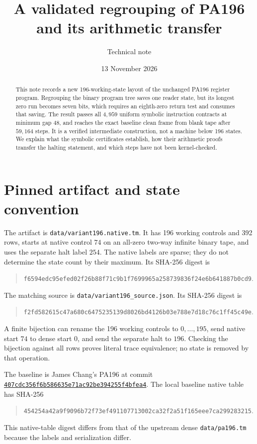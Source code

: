 \documentclass[11pt]{article}
\title{A validated regrouping of PA196\\and its arithmetic transfer}
\author{Technical note}
\date{13 November 2026}
\newcommand{\file}[1]{\texttt{\nolinkurl{#1}}}
\begin{document}
\maketitle

\begin{abstract}
This note records a new 196-working-state layout of the unchanged
PA196 register program.  Regrouping the binary program tree saves
one reader state, but its longest zero run becomes seven bits, which
requires an eighth-zero return test and consumes that saving.  The
result passes all $4{,}959$ uniform symbolic instruction contracts
at minimum gap $48$, and reaches the exact baseline clean frame
from blank tape after $59{,}164$ steps.  It is a verified intermediate
construction, not a machine below 196 states.  We explain what the
symbolic certificates establish, how their arithmetic proofs transfer
the halting statement, and which steps have not been kernel-checked.
\end{abstract}

\section{Pinned artifact and state convention}

The artifact is \file{data/variant196.native.tm}.  It has 196
working controls and 392 rows, starts at native control $74$ on an
all-zero two-way infinite binary tape, and uses the separate halt
label $254$.  The native labels are sparse; they do not determine
the state count by their maximum.  Its SHA-256 digest is
\begin{quote}\small\nolinkurl{f6594edc95efed02f26b88f71c9b1f7699965a258739836f24e6b641887b0cd9}.
\end{quote}
The matching source is \file{data/variant196_source.json}.
Its SHA-256 digest is
\begin{quote}\small\nolinkurl{f2fd582615c47a680c6475235139d8026bd4126b03e788e7d18c76c1ff45c49e}.
\end{quote}
A finite bijection can rename the 196 working controls to
$0,\ldots,195$, send native start $74$ to dense start $0$, and
send the separate halt to $196$.  Checking the bijection against
all rows proves literal trace equivalence; no state is removed by
that operation.

The baseline is James Chang's PA196 at commit
\href{https://github.com/jamesyc/BusyBeaver/tree/407cdc356f6b586635e71ac92be394255f4bfea4}{\nolinkurl{407cdc356f6b586635e71ac92be394255f4bfea4}}.
The local baseline native table has SHA-256
\begin{quote}\small\nolinkurl{454254a42a9f9096b72f73ef491107713002ca32f2a51f165eee7ca299283215}.
\end{quote}
This native-table digest differs from that of the upstream dense
\file{data/pa196.tm} because the labels and serialization differ.
\end{document}
